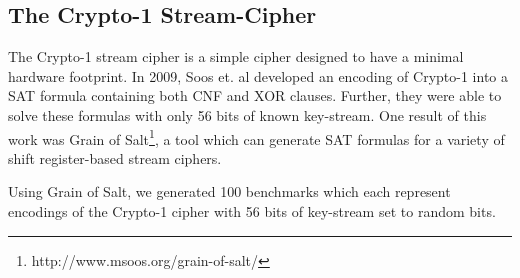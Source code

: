 \subsection{The Crypto-1 Stream-Cipher}
\label{sec:encoding:crypto1}

The Crypto-1 stream cipher is a simple cipher designed to have a minimal hardware footprint. In 2009, Soos et. al \cite{SNC09} developed an encoding of Crypto-1 into a SAT formula containing both CNF and XOR clauses. Further, they were able to solve these formulas with only 56 bits of known key-stream. One result of this work was Grain of Salt\footnote{http://www.msoos.org/grain-of-salt/}, a tool which can generate SAT formulas for a variety of shift register-based stream ciphers.

Using Grain of Salt, we generated 100 benchmarks which each represent encodings of the Crypto-1 cipher with 56 bits of key-stream set to random bits.
